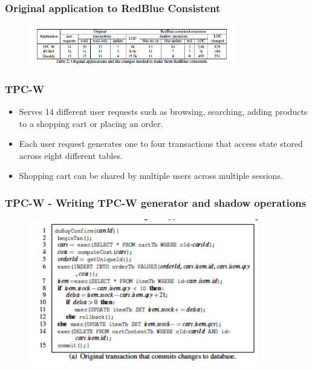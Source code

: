 \documentclass{beamer}
\begin{document}

\begin{frame}
\frametitle{Original application to RedBlue Consistent}
\begin{figure}[t]
\includegraphics[width=9cm]{pic10.jpg}
\centering
\end{figure}

\end{frame}



\begin{frame}
\frametitle{TPC-W}
\begin{itemize}
\item Serves 14 different user requests such as browsing, searching, adding products to a shopping cart or placing an order.
\item Each user request generates one to four transactions that access state stored across eight different tables.
\item Shopping cart can be shared by multiple users across multiple sessions.
\end{itemize}
\end{frame}


\begin{frame}
\frametitle{TPC-W - Writing TPC-W generator and shadow operations}
\begin{figure}[t]
\includegraphics[width=10cm]{pic11.jpg}
\centering
\end{figure}
\end{frame}
\end{document}
